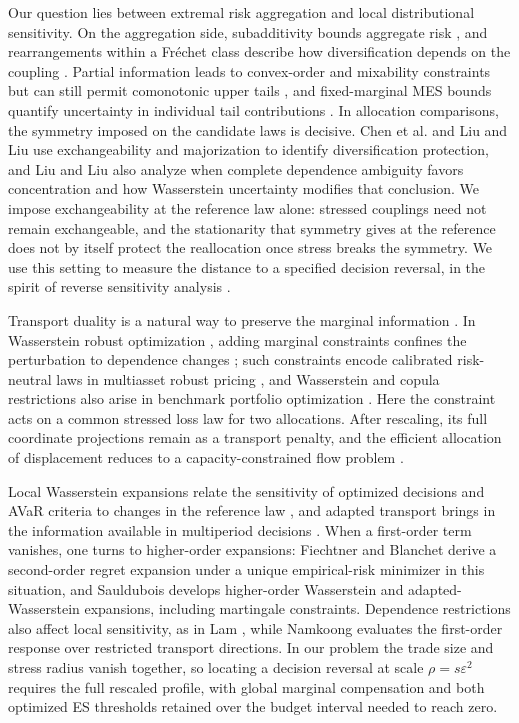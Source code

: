 Our question lies between extremal risk aggregation and local distributional sensitivity. On the aggregation side, subadditivity bounds aggregate risk \cite{artzner1999,mcneil2015}, and rearrangements within a Fr\'echet class describe how diversification depends on the coupling \cite{ruschendorf2013,embrechts2013,bernard2014,embrechts2015,wang2015superadditive}. Partial information leads to convex-order and mixability constraints \cite{li2018partial} but can still permit comonotonic upper tails \cite{devecchinendelstreicher2026}, and fixed-marginal MES bounds quantify uncertainty in individual tail contributions \cite{chenfurmanlin2026}. In allocation comparisons, the symmetry imposed on the candidate laws is decisive. Chen et al. \cite{chen2022} and Liu and Liu \cite{liu2026} use exchangeability and majorization to identify diversification protection, and Liu and Liu also analyze when complete dependence ambiguity favors concentration and how Wasserstein uncertainty modifies that conclusion. We impose exchangeability at the reference law alone: stressed couplings need not remain exchangeable, and the stationarity that symmetry gives at the reference does not by itself protect the reallocation once stress breaks the symmetry. We use this setting to measure the distance to a specified decision reversal, in the spirit of reverse sensitivity analysis \cite{pesenti2019,pesenti2022}.

Transport duality is a natural way to preserve the marginal information \cite{villani2003,santambrogio2015}. In Wasserstein robust optimization \cite{blanchet2019,gao2023}, adding marginal constraints confines the perturbation to dependence changes \cite{gao2017,eckstein2020}; such constraints encode calibrated risk-neutral laws in multiasset robust pricing \cite{eckstein2021multiasset}, and Wasserstein and copula restrictions also arise in benchmark portfolio optimization \cite{pesentijaimungal2023}. Here the constraint acts on a common stressed loss law for two allocations. After rescaling, its full coordinate projections remain as a transport penalty, and the efficient allocation of displacement reduces to a capacity-constrained flow problem \cite{korman2015}.

Local Wasserstein expansions relate the sensitivity of optimized decisions and AVaR criteria to changes in the reference law \cite{bartl2021}, and adapted transport brings in the information available in multiperiod decisions \cite{bartlwiesel2023}. When a first-order term vanishes, one turns to higher-order expansions: Fiechtner and Blanchet \cite{fiechtner2026} derive a second-order regret expansion under a unique empirical-risk minimizer in this situation, and Sauldubois \cite{sauldubois2026} develops higher-order Wasserstein and adapted-Wasserstein expansions, including martingale constraints. Dependence restrictions also affect local sensitivity, as in Lam \cite{lam2018}, while Namkoong \cite{namkoong2026} evaluates the first-order response over restricted transport directions. In our problem the trade size and stress radius vanish together, so locating a decision reversal at scale \(\rho=s\varepsilon^2\) requires the full rescaled profile, with global marginal compensation and both optimized ES thresholds retained over the budget interval needed to reach zero.

